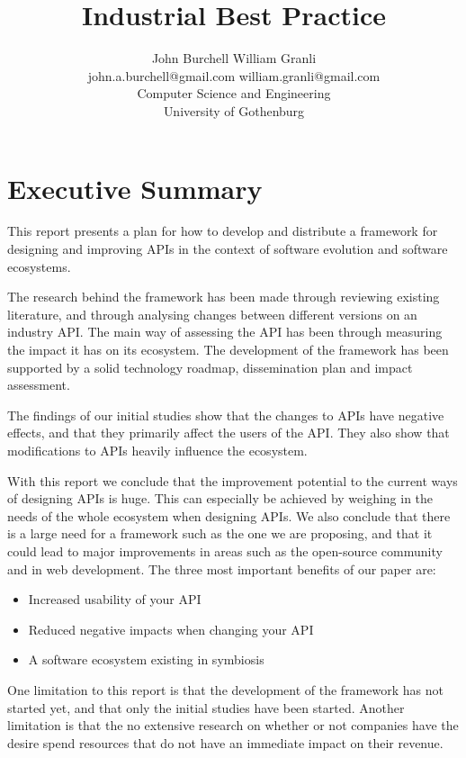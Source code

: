 \documentclass{article}
\title{Industrial Best Practice}
\begin{document}
\author{John Burchell \qquad William Granli \\
		john.a.burchell@gmail.com \qquad william.granli@gmail.com \\
		Computer Science and Engineering  \\
		University of Gothenburg }

\maketitle
\section{Executive Summary}
This report presents a plan for how to develop and distribute a framework for designing and improving APIs in the context of software evolution and software ecosystems. 

The research behind the framework has been made through reviewing existing literature, and through analysing changes between  different versions on an industry API. The main way of assessing the API has been through measuring the impact it has on its ecosystem. The development of the framework has been supported by a solid technology roadmap, dissemination plan and impact assessment. 

The findings of our initial studies show that the changes to APIs have negative effects, and that they primarily affect the users of the API. They also show that modifications to APIs heavily influence the ecosystem. 

With this report we conclude that the improvement potential to the current ways of designing APIs is huge. This can especially be achieved by weighing in the needs of the whole ecosystem when designing APIs. We also conclude that there is a large need for a framework such as the one we are proposing, and that it could lead to major improvements in areas such as the open-source community and in web development. The three most important benefits of our paper are: 

\begin{itemize}
\item Increased usability of your API
\item Reduced negative impacts when changing your API
\item A software ecosystem existing in symbiosis
\end{itemize}

One limitation to this report is that the development of the framework has not started yet, and that only the initial studies have been started. Another limitation is that the no extensive research on whether or not companies have the desire spend resources that do not have an immediate impact on their revenue. 
\end{document}
